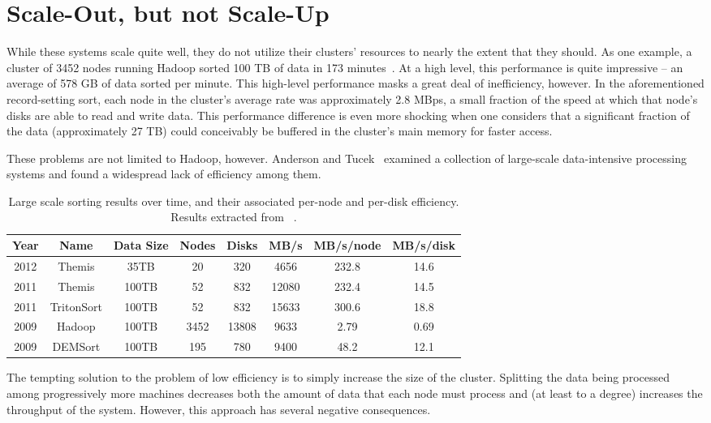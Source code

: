 \section{Scale-Out, but not Scale-Up}

While these systems scale quite well, they do not utilize their clusters'
resources to nearly the extent that they should. As one example, a cluster of
3452 nodes running Hadoop sorted 100 TB of data in 173
minutes~\cite{hadoop-sort-2009}. At a high level, this performance is quite
impressive -- an average of 578 GB of data sorted per minute. This high-level
performance masks a great deal of inefficiency, however. In the aforementioned
record-setting sort, each node in the cluster's average rate was approximately
2.8 MBps, a small fraction of the speed at which that node's disks are able to
read and write data. This performance difference is even more shocking when one
considers that a significant fraction of the data (approximately 27 TB) could
conceivably be buffered in the cluster's main memory for faster access.

These problems are not limited to Hadoop, however. Anderson and
Tucek~\cite{efficiency-matters} examined a collection of large-scale
data-intensive processing systems and found a widespread lack of efficiency
among them.

\begin{table}
\begin{tabular}{c|c|c|c|c|c|c|c}
\textbf{Year} & \textbf{Name} & \textbf{Data Size} & \textbf{Nodes} & \textbf{Disks} & \textbf{MB/s} & \textbf{MB/s/node} & \textbf{MB/s/disk}\\
\hline
2012 & Themis & 35TB & 20 & 320 & 4656 & 232.8 & 14.6 \\
2011 & Themis & 100TB & 52 & 832 & 12080 & 232.4 & 14.5 \\
2011 & TritonSort & 100TB & 52 & 832  & 15633 & 300.6 & 18.8 \\
2009 & Hadoop & 100TB & 3452 & 13808 & 9633 & 2.79 & 0.69 \\
2009 & DEMSort & 100TB & 195 & 780 & 9400 & 48.2 & 12.1
\end{tabular}
\caption{\label{table:system-efficiency} Large scale sorting results over time,
  and their associated per-node and per-disk efficiency. Results extracted from
  ~\cite{efficiency-matters, hadoop-sort-2009, themis, tritonsort}.}
\end{table}

The tempting solution to the problem of low efficiency is to simply increase
the size of the cluster. Splitting the data being processed among progressively
more machines decreases both the amount of data that each node must process and
(at least to a degree) increases the throughput of the system. However, this
approach has several negative consequences.


